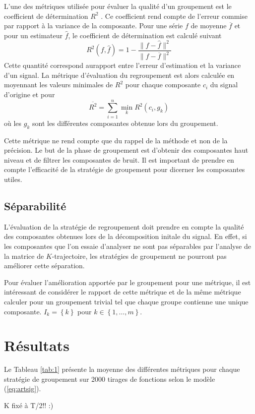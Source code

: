\documentclass{gretsi}
\newcommand{\set}[1]{\left \{ 1, \dots, #1 \right \}}
\begin{document}
    L'une des métriques utilisée pour évaluer la qualité d'un groupement est le coefficient de détermination $R^2$ \cite{abalov_14_auto}. Ce coefficient rend compte de l'erreur commise par rapport à la variance de la composante. Pour une série $f$ de moyenne $\overline f$ et pour un estimateur $\widehat f$, le coefficient de détermination est calculé suivant
    $$
        R^2(f, \widehat f) = 1 - \frac{\|f-\widehat f\|^2}{\|f-\overline f\|^2}
    $$Cette quantité correspond aurapport entre l'erreur d'estimation et la variance d'un signal. La métrique d'évaluation du regroupement est alors calculée en moyennant les valeurs minimales de $R^2$ pour chaque composante $c_i$ du signal d'origine et pour 
    $$
        \overline{ R^2} = \sum_{i=1}^n \min_k R^2(c_i, g_k)
    $$où les $g_k$ sont les différentes composantes obtenue lors du groupement.
    
    Cette métrique ne rend compte que du rappel de la méthode et non de la précision. Le but de la phase de groupement est d'obtenir des composantes haut niveau et de filtrer les composantes de bruit. Il est important de prendre en compte l'efficacité de la stratégie de groupement pour dicerner les composantes utiles.


\subsection{Séparabilité}
\label{sub:sep}
    L'évaluation de la stratégie de regroupement doit prendre en compte la qualité des composantes obtenues lors de la décomposition initale du signal. En effet, si les composantes que l'on essaie d'analyser ne sont pas séparables par l'analyse de la matrice de $K$-trajectoire, les stratégies de groupement ne pourront pas améliorer cette séparation.
    
       
   Pour évaluer l'amélioration apportée par le groupement pour une métrique, il est intéressant de considérer le rapport de cette métrique et de la même métrique calculer pour un groupement trivial tel que chaque groupe contienne une unique composante. $I_k = \left \{ k \right \}$ pour $k \in \set{m}$.

\section{Résultats}
\label{sec:res}
Le Tableau \ref{tab:1} présente la moyenne des différentes métriques pour chaque stratégie de groupement sur 2000 tirages de fonctions selon le modèle (\ref{eq:artsig}).

K fixé à T/2!! :)

 
{}
\end{document}
